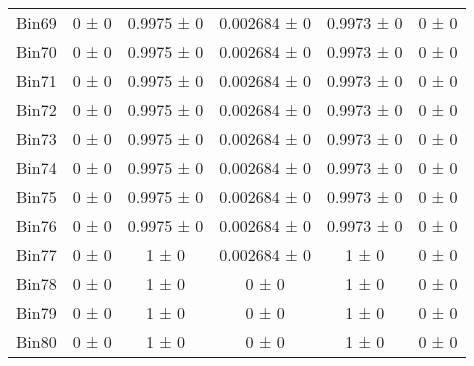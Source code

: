 \begin{tabular}{@{\extracolsep{4pt}}lccccc@{}}
     Bin69 & 0 ± 0 & 0.9975 ± 0 & 0.002684 ± 0 & 0.9973 ± 0 & 0 ± 0 \\ 
     Bin70 & 0 ± 0 & 0.9975 ± 0 & 0.002684 ± 0 & 0.9973 ± 0 & 0 ± 0 \\ 
     Bin71 & 0 ± 0 & 0.9975 ± 0 & 0.002684 ± 0 & 0.9973 ± 0 & 0 ± 0 \\ 
     Bin72 & 0 ± 0 & 0.9975 ± 0 & 0.002684 ± 0 & 0.9973 ± 0 & 0 ± 0 \\ 
     Bin73 & 0 ± 0 & 0.9975 ± 0 & 0.002684 ± 0 & 0.9973 ± 0 & 0 ± 0 \\ 
     Bin74 & 0 ± 0 & 0.9975 ± 0 & 0.002684 ± 0 & 0.9973 ± 0 & 0 ± 0 \\ 
     Bin75 & 0 ± 0 & 0.9975 ± 0 & 0.002684 ± 0 & 0.9973 ± 0 & 0 ± 0 \\ 
     Bin76 & 0 ± 0 & 0.9975 ± 0 & 0.002684 ± 0 & 0.9973 ± 0 & 0 ± 0 \\ 
     Bin77 & 0 ± 0 & 1 ± 0 & 0.002684 ± 0 & 1 ± 0 & 0 ± 0 \\ 
     Bin78 & 0 ± 0 & 1 ± 0 & 0 ± 0 & 1 ± 0 & 0 ± 0 \\ 
     Bin79 & 0 ± 0 & 1 ± 0 & 0 ± 0 & 1 ± 0 & 0 ± 0 \\ 
     Bin80 & 0 ± 0 & 1 ± 0 & 0 ± 0 & 1 ± 0 & 0 ± 0 \\ 
\hline\hline
  \end{tabular}
